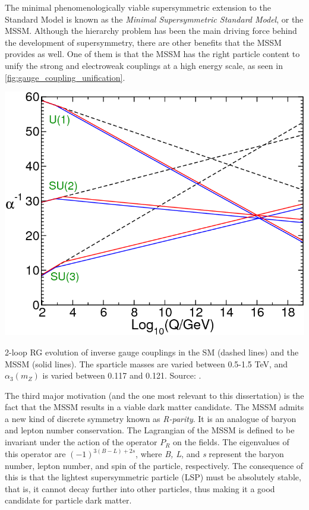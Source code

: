The minimal phenomenologically viable supersymmetric extension to the Standard Model is known as the \emph{Minimal Supersymmetric Standard Model}, or the MSSM. Although the hierarchy problem has been the main driving force behind the development of supersymmetry, there are other benefits that the MSSM provides as well.
One of them is that the MSSM has the right particle content to unify the strong and electroweak couplings at a high energy scale, as seen in \autoref{fig:gauge_coupling_unification}.

\begin{marginfigure}[-4cm]
    \includegraphics[width=\textwidth]{images/gauge_coupling_unification}
  \caption{2-loop RG evolution of inverse gauge couplings in the SM (dashed lines) and the MSSM (solid lines). The sparticle masses are varied between 0.5-1.5 TeV, and $\alpha_3(m_Z)$ is varied between 0.117 and 0.121. Source: \citep{Martin1997}.}
  \label{fig:gauge_coupling_unification}
\end{marginfigure}

The third major motivation (and the one most relevant to this dissertation) is the fact that the MSSM results in a viable dark matter candidate. The MSSM admits a new kind of discrete symmetry known as \emph{R-parity}. It is an analogue of baryon and lepton number conservation. The Lagrangian of the MSSM is defined to be invariant under the action of the operator $P_R$ on the fields. The eigenvalues of this operator are $(-1)^{3(B-L)+2s}$, where \emph{B, L}, and \emph{s} represent the baryon number, lepton number, and spin of the particle, respectively. The consequence of this is that the lightest supersymmetric particle (LSP) must be absolutely stable, that is, it cannot decay further into other particles, thus making it a good candidate for particle dark matter.

